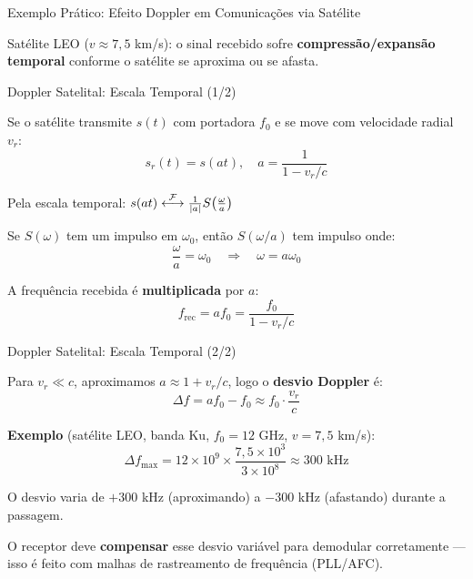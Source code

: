 \begin{frame}{Exemplo Prático: Efeito Doppler em Comunicações via Satélite}
\begin{center}
\end{center}
\vspace{-2mm}

Satélite LEO ($v \approx 7{,}5$ km/s): o sinal recebido sofre \textbf{compressão/expansão temporal} conforme o satélite se aproxima ou se afasta.

\end{frame}


\begin{frame}{Doppler Satelital: Escala Temporal (1/2)}

Se o satélite transmite $s(t)$ com portadora $f_0$ e se move com velocidade radial $v_r$:
\[
s_r(t) = s(at), \quad a = \frac{1}{1 - v_r/c}
\]

Pela escala temporal:
$s(at) \mathrel{\overset{\mathcal{F}}{\longleftrightarrow}} \tfrac{1}{|a|}S\!\left(\tfrac{\omega}{a}\right)$

\vspace{0.3cm}

Se $S(\omega)$ tem um impulso em $\omega_0$, então $S(\omega/a)$ tem impulso onde:
\[
\frac{\omega}{a} = \omega_0 \quad \Rightarrow \quad \omega = a\omega_0
\]

A frequência recebida é \textbf{multiplicada} por $a$:
\[
f_{\text{rec}} = af_0 = \frac{f_0}{1 - v_r/c}
\]

\end{frame}


\begin{frame}{Doppler Satelital: Escala Temporal (2/2)}

Para $v_r \ll c$, aproximamos $a \approx 1 + v_r/c$, logo o \textbf{desvio Doppler} é:
\[
\boxed{\Delta f = af_0 - f_0 \approx f_0 \cdot \frac{v_r}{c}}
\]

\textbf{Exemplo} (satélite LEO, banda Ku, $f_0 = 12$ GHz, $v = 7{,}5$ km/s):
\[
\Delta f_{\max} = 12 \times 10^9 \times \frac{7{,}5 \times 10^3}{3 \times 10^8} \approx 300 \text{ kHz}
\]

O desvio varia de $+300$ kHz (aproximando) a $-300$ kHz (afastando) durante a passagem.

\vspace{0.3cm}

O receptor deve \textbf{compensar} esse desvio variável para demodular corretamente --- isso é feito com malhas de rastreamento de frequência (PLL/AFC).

\end{frame}

